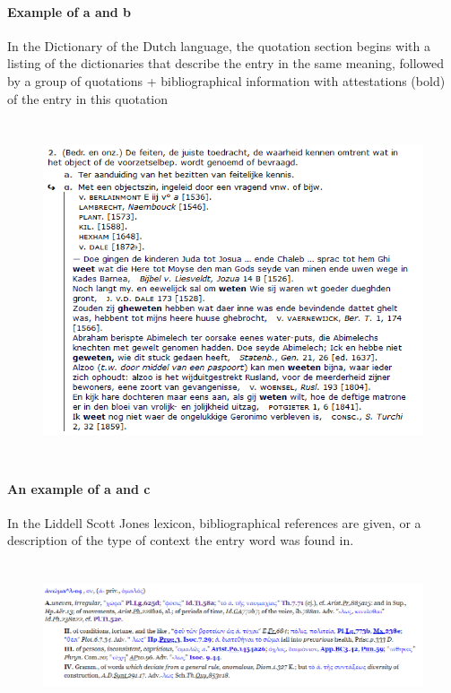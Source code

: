 \documentclass[10pt]{article}
\begin{document}
\paragraph*{Example of a and b}

 In the Dictionary of the Dutch language, the quotation section begins with a listing of the dictionaries that describe the entry in the same meaning, followed by a group of quotations + bibliographical information with attestations (bold) of the entry in this quotation\par



\begin{figure}[H]
	\begin{Center}
		\includegraphics[width=5.14in,height=3.93in]{./image19.png}
	\end{Center}
\end{figure}


\paragraph*{An example of a and c}

 In the Liddell Scott Jones lexicon, bibliographical references are given, or a description of the type of context the entry word was found in.

\begin{figure}[H]
\advance\leftskip 0.12in		\includegraphics[width=6.27in,height=1.69in]{./image14.png}
\end{figure}
\end{document}
